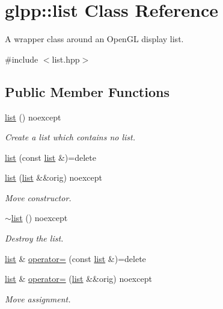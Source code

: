 \hypertarget{classglpp_1_1list}{}\section{glpp\+:\+:list Class Reference}
\label{classglpp_1_1list}


A wrapper class around an Open\+GL display list.  




{\ttfamily \#include $<$list.\+hpp$>$}

\subsection*{Public Member Functions}
\begin{DoxyCompactItemize}
\item 
\hyperlink{classglpp_1_1list_adf35376b2885cf8a455cf0611b6a6df2}{list} () noexcept
\begin{DoxyCompactList}\small\item\em Create a list which contains no list. \end{DoxyCompactList}\item 
\hyperlink{classglpp_1_1list_a55814bd10129c619115f95bbebef7197}{list} (const \hyperlink{classglpp_1_1list}{list} \&)=delete
\item 
\hyperlink{classglpp_1_1list_ab5287a3d79b3ebb25da54a5f01d1edff}{list} (\hyperlink{classglpp_1_1list}{list} \&\&orig) noexcept
\begin{DoxyCompactList}\small\item\em Move constructor. \end{DoxyCompactList}\item 
\hyperlink{classglpp_1_1list_acae5cc28ee69a9cc37c6b812d60d09b2}{$\sim$list} () noexcept
\begin{DoxyCompactList}\small\item\em Destroy the list. \end{DoxyCompactList}\item 
\hyperlink{classglpp_1_1list}{list} \& \hyperlink{classglpp_1_1list_a2ae6b7f26d0fad6c358770fc7dd64389}{operator=} (const \hyperlink{classglpp_1_1list}{list} \&)=delete
\item 
\hyperlink{classglpp_1_1list}{list} \& \hyperlink{classglpp_1_1list_a74fbee0338eac4b1df84aedcefb0fc4d}{operator=} (\hyperlink{classglpp_1_1list}{list} \&\&orig) noexcept
\begin{DoxyCompactList}\small\item\em Move assignment. \end{DoxyCompactList}\end{DoxyCompactItemize}
